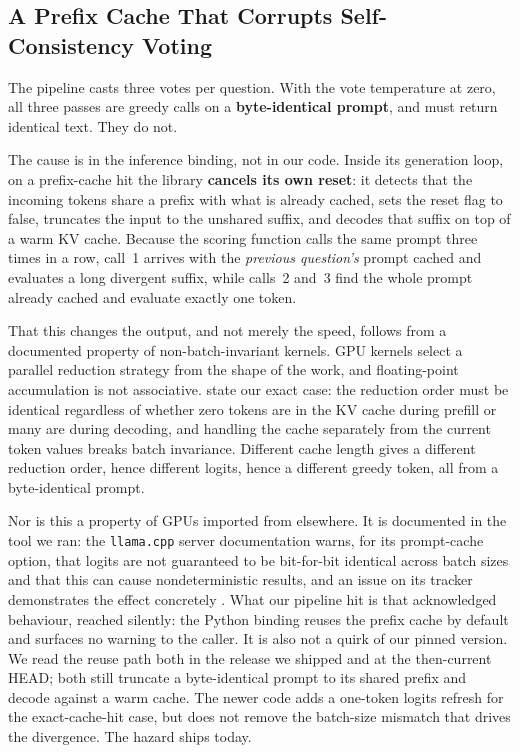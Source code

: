 \documentclass{article}
\begin{document}
\subsection{A Prefix Cache That Corrupts Self-Consistency Voting}
\label{sec:cache}

The pipeline casts three votes per question. With the vote temperature at zero, all three passes are greedy calls on a \textbf{byte-identical prompt}, and must return identical text. They do not.

The cause is in the inference binding, not in our code. Inside its generation loop, on a prefix-cache hit the library \textbf{cancels its own reset}: it detects that the incoming tokens share a prefix with what is already cached, sets the reset flag to false, truncates the input to the unshared suffix, and decodes that suffix on top of a warm KV cache. Because the scoring function calls the same prompt three times in a row, call~1 arrives with the \emph{previous question's} prompt cached and evaluates a long divergent suffix, while calls~2 and~3 find the whole prompt already cached and evaluate exactly one token.

That this changes the output, and not merely the speed, follows from a documented property of non-batch-invariant kernels. GPU kernels select a parallel reduction strategy from the shape of the work, and floating-point accumulation is not associative.  state our exact case: the reduction order must be identical regardless of whether zero tokens are in the KV cache during prefill or many are during decoding, and handling the cache separately from the current token values breaks batch invariance. Different cache length gives a different reduction order, hence different logits, hence a different greedy token, all from a byte-identical prompt.

Nor is this a property of GPUs imported from elsewhere. It is documented in the tool we ran: the \texttt{llama.cpp} server documentation warns, for its prompt-cache option, that logits are not guaranteed to be bit-for-bit identical across batch sizes and that this can cause nondeterministic results, and an issue on its tracker demonstrates the effect concretely \cite{llamacpp_issue4479}. What our pipeline hit is that acknowledged behaviour, reached silently: the Python binding reuses the prefix cache by default and surfaces no warning to the caller. It is also not a quirk of our pinned version. We read the reuse path both in the release we shipped and at the then-current HEAD; both still truncate a byte-identical prompt to its shared prefix and decode against a warm cache. The newer code adds a one-token logits refresh for the exact-cache-hit case, but does not remove the batch-size mismatch that drives the divergence. The hazard ships today.
\end{document}
